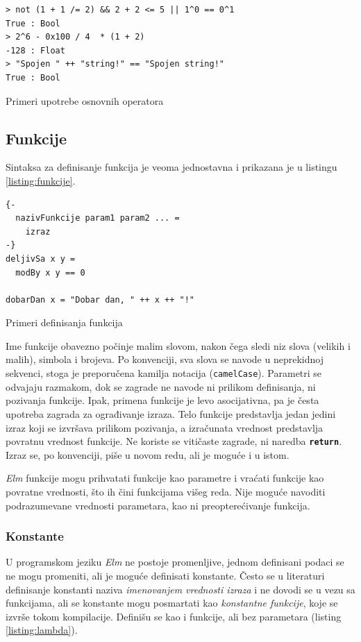 \documentclass[12pt,oneside]{memoir}
\begin{document}
\begin{listing}[h]
\begin{verbatim}
> not (1 + 1 /= 2) && 2 + 2 <= 5 || 1^0 == 0^1 
True : Bool
> 2^6 - 0x100 / 4  * (1 + 2)
-128 : Float
> "Spojen " ++ "string!" == "Spojen string!"
True : Bool
\end{verbatim}
\caption{Primeri upotrebe osnovnih operatora}
\label{listing:operatori}
\end{listing}

\subsection{Funkcije}  
Sintaksa za definisanje funkcija je veoma jednostavna i prikazana je u listingu 
\ref{listing:funkcije}.
\begin{listing}[h]
\begin{verbatim}
{-
  nazivFunkcije param1 param2 ... =
    izraz  
-}
deljivSa x y =
  modBy x y == 0

dobarDan x = "Dobar dan, " ++ x ++ "!"  
\end{verbatim}
\caption{Primeri definisanja funkcija}
\label{listing:funkcije}
\end{listing}

Ime funkcije obavezno počinje malim slovom, nakon čega sledi niz slova (velikih i malih),
simbola \texttt{\textbf{\textunderscore}} i brojeva. Po konvenciji, sva slova se navode u
neprekidnoj sekvenci, stoga je preporučena kamilja notacija (\texttt{camelCase}).
Parametri se odvajaju razmakom, dok se zagrade ne navode ni prilikom definisanja, ni
pozivanja funkcije. Ipak, primena funkcije je levo asocijativna, pa je česta upotreba
zagrada za ograđivanje izraza. Telo funkcije predstavlja jedan jedini izraz koji se izvršava
prilikom pozivanja, a izračunata vrednost predstavlja povratnu vrednost funkcije. Ne koriste
se vitičaste zagrade, ni naredba \texttt{\textbf{return}}. Izraz se, po konvenciji, piše u
novom redu, ali je moguće i u istom.

\emph{Elm} funkcije mogu prihvatati funkcije kao parametre i vraćati funkcije kao 
povratne vrednosti, što ih čini funkcijama višeg reda. Nije moguće navoditi
podrazumevane vrednosti parametara, kao ni preopterećivanje funkcija.

\subsubsection{Konstante}
U programskom jeziku \emph{Elm} ne postoje promenljive, jednom definisani podaci se ne mogu promeniti, ali je 
moguće definisati konstante. Često se u literaturi definisanje konstanti naziva 
\emph{imenovanjem vrednosti izraza} i ne dovodi se u vezu sa funkcijama, ali se konstante 
mogu posmartati kao \emph{konstantne funkcije}, koje se izvrše tokom kompilacije. Definišu se
kao i funkcije, ali bez parametara (listing \ref{listing:lambda}).
\end{document}
